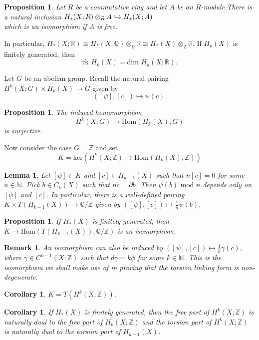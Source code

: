 \documentclass{article}
\newtheorem{lemma}[theorem]{Lemma}
\newtheorem{proposition}[theorem]{Proposition}
\newtheorem{corollary}[theorem]{Corollary}
\newtheorem{remark}[theorem]{Remark}
\begin{document}
\begin{proposition}
Let $R$ be a commutative ring and let $A$ be an $R$-module.There is a natural inclusion $H_*(X;R)\otimes_RA\xhookrightarrow{}H_*(X;A)$\\
which is an isomorphism if $A$ is free.
\end{proposition}

In particular, $H_*(X;\mathbb{R})\cong H_*(X;\mathbb{Q})\otimes_\mathbb{Q}\mathbb{R}\cong H_*(X)\otimes_\mathbb{Z}\mathbb{R}$. If $H_k(X)$ is finitely generated, then \[\text{rk }H_k(X)=\text{dim }H_k(X;\mathbb{R}).\]

Let $G$ be an abelian group. Recall the natural pairing $H^k(X;G)\times H_k(X)\to G$ given by \[([\psi],[c])\mapsto\psi(c).\]

\begin{proposition}
The induced homomorphism \[H^k(X;G)\to\text{Hom}(H_k(X);G)\]is surjective.
\end{proposition}
Now consider the case $G=\mathbb{Z}$ and set\[K=\text{ker}(H^k(X;\mathbb{Z})\to\text{Hom}(H_k(X),\mathbb{Z}))\]
\begin{lemma}
Let $[\psi]\in K$ and $[c]\in H_{k-1}(X)$ such that $n[c]=0$ for some $n\in\mathbb{N}$. Pick $b\in C_k(X)$ such that $nc=\partial b$. Then $\psi(b)\text{ mod }n$ depends only on $[\psi]$ and $[c]$.
In particular, there is a well-defined pairing $K\times T(H_{k-1}(X))\to\mathbb{Q}/\mathbb{Z}$ given by $([\psi],[c])\mapsto\frac{1}{n}\psi(b)$.
\end{lemma}

\begin{proposition}
If $H_*(X)$ is finitely generated, then $K\to\text{Hom}(T(H_{k-1}(X)),\mathbb{Q}/\mathbb{Z})$ is an isomorphism.
\end{proposition}

\begin{remark}
An isomorphism can also be induced by $([\psi],[c])\mapsto\frac{1}{k}\gamma(c)$, where $\gamma\in C^{k-1}(X;\mathbb{Z})$ such that $d\gamma=k\phi$ for some $k\in\mathbb{N}$. This is the isomorphism we shall make use of in proving that the torsion linking form is non-degenerate.
\end{remark}

\begin{corollary}
$K=T(H^k(X;\mathbb{Z}))$.
\end{corollary}
\begin{corollary}
If $H_*(X)$ is finitely generated, then the free part of $H^k(X;\mathbb{Z})$ is naturally dual to the free part of $H_k(X;\mathbb{Z})$ and the torsion part of $H^k(X;\mathbb{Z})$ is naturally dual to the torsion part of $H_{k-1}(X)$.
\end{corollary}
\end{document}
